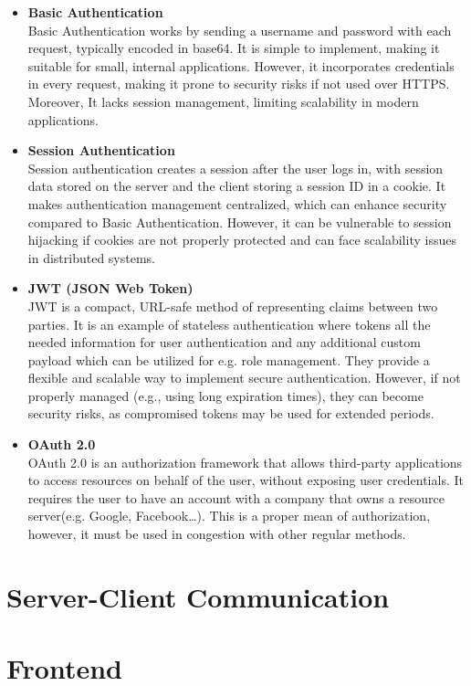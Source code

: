 \begin{itemize}
    \item \textbf{Basic Authentication} \\
    Basic Authentication works by sending a username and password with each request,
    typically encoded in base64.\cite{basic_auth} It is simple to implement, making it suitable for
    small, internal applications. However, it incorporates credentials in every request,
    making it prone to security risks if not used over HTTPS. Moreover, It lacks session management,
    limiting scalability in modern applications.

    \item \textbf{Session Authentication} \\
    Session authentication creates a session after the user logs in, with session
    data stored on the server and the client storing a session ID in a cookie.
    It makes authentication management centralized, which can enhance security compared to Basic Authentication.
    However, it can be vulnerable to session hijacking if cookies are not properly protected
    and can face scalability issues in distributed systems.\cite{session_auth}

    \item \textbf{JWT (JSON Web Token)} \\
    JWT is a compact, URL-safe method of representing claims between two parties.\cite{jwt}
    It is an example of stateless authentication where tokens all the needed information for user authentication
    and any additional custom payload which can be utilized for e.g. role management.
    They provide a flexible and scalable way to implement secure authentication.
    However, if not properly managed (e.g., using long expiration times), they can become security risks,
    as compromised tokens may be used for extended periods.

    \item \textbf{OAuth 2.0} \\
    OAuth 2.0 is an authorization framework that allows third-party applications to access resources
    on behalf of the user, without exposing user credentials.\cite{oauth2} It requires the user to have an account
    with a company that owns a resource server(e.g. Google, Facebook\ldots). This is a proper mean of
    authorization, however, it must be used in congestion with other regular methods.
\end{itemize}


\section{Server-Client Communication}


\section{Frontend}
